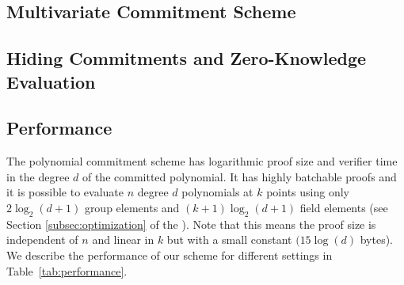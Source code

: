 \subsection{Multivariate Commitment Scheme}
\label{sec:multivariate}



\subsection{Hiding Commitments and Zero-Knowledge Evaluation}
\label{section:zeroknowlege}


\subsection{Performance}
The polynomial commitment scheme has logarithmic proof size and verifier time in the degree $d$ of the committed polynomial. 
It has highly batchable proofs and it is possible to evaluate $n$ degree $d$ polynomials at $k$ points using only $2\log_2(d+1)$ group elements and $(k+1)\log_2(d+1)$ field elements (see Section \ref{subsec:optimization} of the \appendixphrase). Note that this means the proof size is independent of $n$ and linear in $k$ but with a small constant $(15 \log(d)$ bytes). 
We describe the performance of our scheme for different settings in Table~\ref{tab:performance}.

